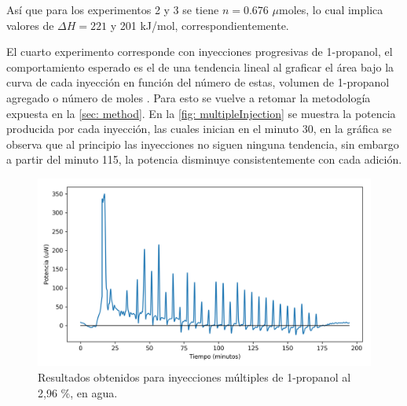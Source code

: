 		As\'i que para los experimentos 2 y 3 se tiene $n = 0.676$ $\mu$moles, lo cual implica valores de $\Delta H = 221$ y 201 kJ/mol, correspondientemente. 
		
		El cuarto experimento corresponde con inyecciones progresivas de 1-propanol, el comportamiento esperado es el de una tendencia lineal al graficar el \'area bajo la curva de cada inyecci\'on en funci\'on del n\'umero de estas, volumen de 1-propanol agregado o n\'umero de moles \cite{adao2012chemical,demarse2011calibration,nanoitc,adao2012chemical}. Para esto se vuelve a retomar la metodolog\'ia expuesta en la \autoref{sec: method}. En la \autoref{fig: multipleInjection} se muestra la potencia producida por cada inyecci\'on, las cuales inician en el minuto 30, en la gr\'afica se observa que al principio las inyecciones no siguen ninguna tendencia, sin embargo a partir del minuto 115, la potencia disminuye consistentemente con cada adici\'on.
		\begin{figure}[h]
			\centering
			\includegraphics[width=\linewidth]{../Data/ChemicalCalibrations/multiple}
			\caption{Resultados obtenidos para inyecciones m\'ultiples de 1-propanol al 2,96 \%, en agua.}
			\label{fig: multipleInjection}
		\end{figure}
		
